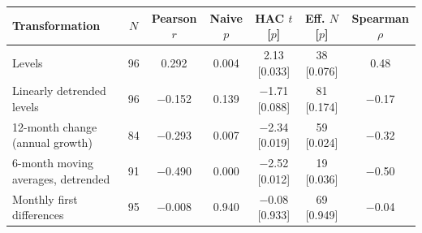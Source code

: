 \begin{tabular}{@{} L{4.4cm} c cc cc c @{}}
\toprule
\textbf{Transformation} & $N$ & \textbf{Pearson} $r$ & \textbf{Naive} $p$ & \textbf{HAC} $t$ [$p$] & \textbf{Eff.} $N$ [$p$] & \textbf{Spearman} $\rho$ \\
\midrule
Levels & 96 & 0.292 & 0.004 & 2.13 [0.033] & 38 [0.076] & 0.48 \\
Linearly detrended levels & 96 & $-$0.152 & 0.139 & $-$1.71 [0.088] & 81 [0.174] & $-$0.17 \\
12-month change (annual growth) & 84 & $-$0.293 & 0.007 & $-$2.34 [0.019] & 59 [0.024] & $-$0.32 \\
6-month moving averages, detrended & 91 & $-$0.490 & 0.000 & $-$2.52 [0.012] & 19 [0.036] & $-$0.50 \\
Monthly first differences & 95 & $-$0.008 & 0.940 & $-$0.08 [0.933] & 69 [0.949] & $-$0.04 \\
\bottomrule
\end{tabular}